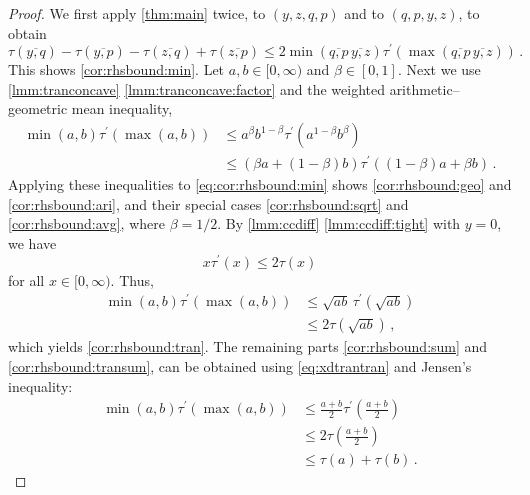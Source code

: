 \documentclass{article}
\newcommand{\lb}{\left(} %
\newcommand{\rb}{\right)} %
\newcommand{\br}[1]{\lb #1 \rb} %
\newcommand{\brOf}[1]{\!\br{#1}} %
\newcommand{\Rp}{[0, \infty)} %
\newcommand{\pr}{^\prime}
\newcommand{\equationFullstop}{\, .}
\newcommand{\eqfs}{\equationFullstop}
\newcommand{\equationComma}{\, ,}
\newcommand{\eqcm}{\equationComma}
\newcommand{\ol}[2]{\overline{#1,#2}}
\newcommand{\tran}{\tau}
\newcommand{\dtran}{\tran\pr}
\begin{document}
\begin{proof}
	We first apply \cref{thm:main} twice, to $(y,z,q,p)$ and  to $(q,p,y,z)$, to obtain
	\begin{equation}\label{eq:cor:rhsbound:min}
		\tran(\ol yq) - \tran(\ol yp) - \tran(\ol zq) + \tran(\ol zp) \leq 2 \min(\ol qp\, \ol yz) \dtran\brOf{\max(\ol qp\, \ol yz)}
		\eqfs
	\end{equation}
	This shows \ref{cor:rhsbound:min}.
	Let $a,b\in\Rp$ and $\beta\in [0,1]$. Next we use \cref{lmm:tranconcave} \ref{lmm:tranconcave:factor} and the weighted arithmetic--geometric mean inequality, 
	\begin{align*}
		\min(a,b) \dtran(\max(a,b)) 
		&\leq 
		a^\beta b^{1-\beta} \dtran(a^{1-\beta} b^\beta)
		\\&\leq 
		\br{\beta a + (1-\beta)b} \dtran((1-\beta)a + \beta b)
		\eqfs
	\end{align*}
	Applying these inequalities to \eqref{eq:cor:rhsbound:min} shows \ref{cor:rhsbound:geo} and \ref{cor:rhsbound:ari}, and their special cases \ref{cor:rhsbound:sqrt} and \ref{cor:rhsbound:avg}, where $\beta=1/2$.
	By \cref{lmm:ccdiff} \ref{lmm:ccdiff:tight} with $y=0$, we have 
	\begin{equation}\label{eq:xdtrantran}
		x\dtran(x) \leq 2 \tran(x)
	\end{equation}
	for all $x\in\Rp$. Thus,
	\begin{align*}
		\min(a,b) \dtran(\max(a,b)) 
		&\leq 
		\sqrt{a b} \,\dtran(\sqrt{a b})
		\\&\leq 
		2\tran(\sqrt{a b})
		\eqcm
	\end{align*}
	which yields \ref{cor:rhsbound:tran}. The remaining parts \ref{cor:rhsbound:sum} and \ref{cor:rhsbound:transum}, can be obtained using \eqref{eq:xdtrantran} and Jensen's inequality:
	\begin{align*}
		\min(a,b) \dtran(\max(a,b)) 
		&\leq 
		\frac{a+b}2 \dtran\brOf{\frac{a+b}2}
		\\&\leq 
		2\tran\brOf{\frac{a+b}2}
		\\&\leq 
		\tran(a) + \tran(b)
		\eqfs
	\end{align*}
\end{proof}
%
%
%
\end{document}
